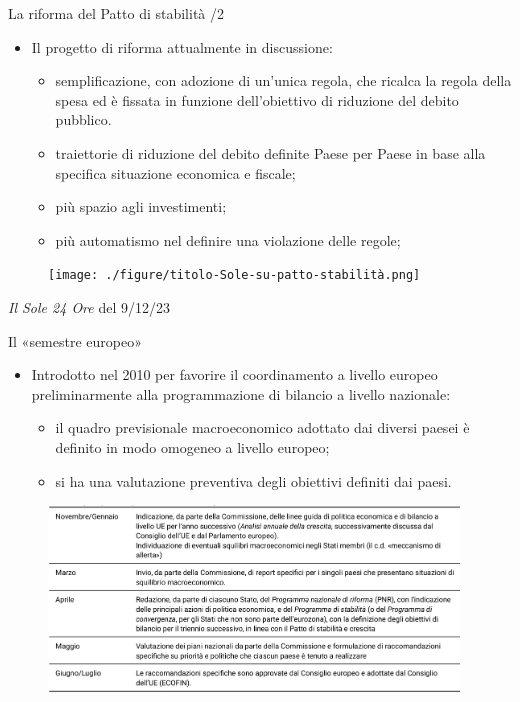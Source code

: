 \documentclass[aspectratio=149,11pt,italian]{beamer}
\begin{document}
\begin{frame}{La riforma del Patto di stabilità /2}
\begin{itemize}
\item Il progetto di riforma attualmente in discussione:
\begin{itemize}
\item semplificazione, con adozione di un'unica regola, che ricalca la \alert{regola
della spesa} ed è fissata in funzione dell'obiettivo di riduzione del
debito pubblico.
\item traiettorie di riduzione del debito definite Paese per Paese in base alla
specifica situazione economica e fiscale;
\item più spazio agli investimenti;
\item più automatismo nel definire una violazione delle regole;
\end{itemize}
\end{itemize}

\begin{figure}
\centering
\texttt{[image: ./figure/titolo-Sole-su-patto-stabilità.png]}
\end{figure}
\scriptsize
\emph{Il Sole 24 Ore} del 9/12/23
\end{frame}

\begin{frame}{Il «semestre europeo»}
\begin{itemize}
\item Introdotto nel 2010 per favorire il coordinamento a livello europeo
preliminarmente alla programmazione di bilancio a livello nazionale:
\begin{itemize}
\item il quadro previsionale macroeconomico adottato dai diversi paesei è definito
in modo omogeneo a livello europeo;
\item si ha una valutazione preventiva degli obiettivi definiti dai paesi.
\end{itemize}
\end{itemize}

\begin{figure}[htbp]
\centering
\includegraphics[height=5cm]{./figure/semestre-europeo.png}
\end{figure}
\end{frame}
\end{document}
